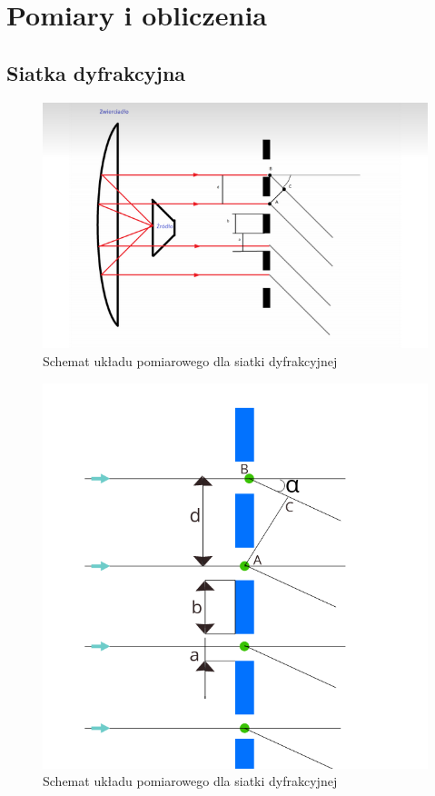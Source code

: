 \documentclass[a4paper]{article}
\newlength{\du}
\begin{document}
\newpage

\section{Pomiary i obliczenia}
\subsection{Siatka dyfrakcyjna}
\begin{figure}[h]
\centering
\includegraphics[scale=0.4]{siatka_dyfrakcyjna_rysunek.png}
\caption{Schemat układu pomiarowego dla siatki dyfrakcyjnej}
\label{siatka_dyfrakcyjna}
\end{figure}

\begin{figure}[h!]
\centering
\includegraphics[scale=0.4]{siatka.png}
\caption{Schemat układu pomiarowego dla siatki dyfrakcyjnej}
\label{siatka}
\end{figure}
\end{document}
